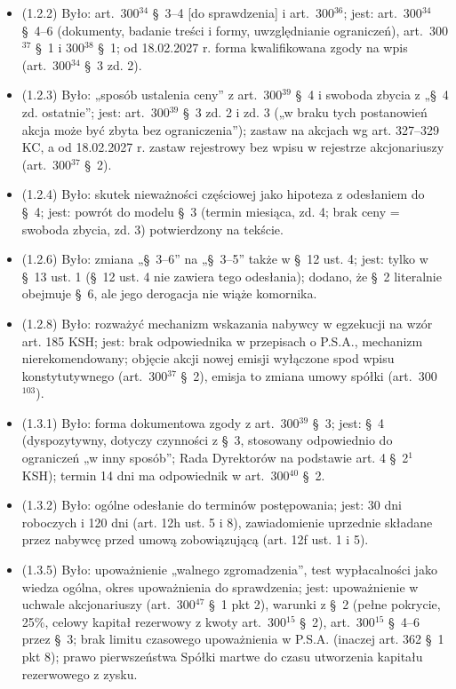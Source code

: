 \documentclass[12pt,a4paper]{report}
\begin{document}
\begin{itemize}
  \item (1.2.2) Było: art.~300$^{34}$ §~3--4 [do sprawdzenia] i art.~300$^{36}$; jest: art.~300$^{34}$ §~4--6 (dokumenty, badanie treści i formy, uwzględnianie ograniczeń), art.~300$^{37}$ §~1 i 300$^{38}$ §~1; od 18.02.2027 r. forma kwalifikowana zgody na wpis (art.~300$^{34}$ §~3 zd. 2).
  \item (1.2.3) Było: „sposób ustalenia ceny” z art.~300$^{39}$ §~4 i swoboda zbycia z „§~4 zd. ostatnie”; jest: art.~300$^{39}$ §~3 zd. 2 i zd. 3 („w braku tych postanowień akcja może być zbyta bez ograniczenia”); zastaw na akcjach wg art. 327--329 KC, a od 18.02.2027 r. zastaw rejestrowy bez wpisu w rejestrze akcjonariuszy (art.~300$^{37}$ §~2).
  \item (1.2.4) Było: skutek nieważności częściowej jako hipoteza z odesłaniem do §~4; jest: powrót do modelu §~3 (termin miesiąca, zd. 4; brak ceny = swoboda zbycia, zd. 3) potwierdzony na tekście.
  \item (1.2.6) Było: zmiana „§~3--6” na „§~3--5” także w §~12 ust. 4; jest: tylko w §~13 ust. 1 (§~12 ust. 4 nie zawiera tego odesłania); dodano, że §~2 literalnie obejmuje §~6, ale jego derogacja nie wiąże komornika.
  \item (1.2.8) Było: rozważyć mechanizm wskazania nabywcy w egzekucji na wzór art. 185 KSH; jest: brak odpowiednika w przepisach o P.S.A., mechanizm nierekomendowany; objęcie akcji nowej emisji wyłączone spod wpisu konstytutywnego (art.~300$^{37}$ §~2), emisja to zmiana umowy spółki (art.~300$^{103}$).
  \item (1.3.1) Było: forma dokumentowa zgody z art.~300$^{39}$ §~3; jest: §~4 (dyspozytywny, dotyczy czynności z §~3, stosowany odpowiednio do ograniczeń „w inny sposób”; Rada Dyrektorów na podstawie art. 4 §~2$^{1}$ KSH); termin 14 dni ma odpowiednik w art.~300$^{40}$ §~2.
  \item (1.3.2) Było: ogólne odesłanie do terminów postępowania; jest: 30 dni roboczych i 120 dni (art. 12h ust. 5 i 8), zawiadomienie uprzednie składane przez nabywcę przed umową zobowiązującą (art. 12f ust. 1 i 5).
  \item (1.3.5) Było: upoważnienie „walnego zgromadzenia”, test wypłacalności jako wiedza ogólna, okres upoważnienia do sprawdzenia; jest: upoważnienie w uchwale akcjonariuszy (art.~300$^{47}$ §~1 pkt 2), warunki z §~2 (pełne pokrycie, 25\%, celowy kapitał rezerwowy z kwoty art.~300$^{15}$ §~2), art.~300$^{15}$ §~4--6 przez §~3; brak limitu czasowego upoważnienia w P.S.A. (inaczej art. 362 §~1 pkt 8); prawo pierwszeństwa Spółki martwe do czasu utworzenia kapitału rezerwowego z zysku.

\end{itemize}
\end{document}
